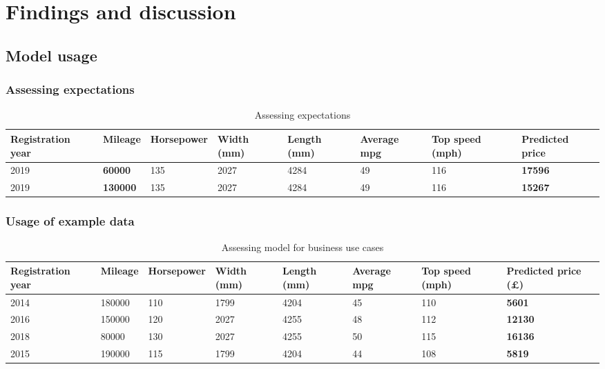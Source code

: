 \chapter{Findings and discussion}

\section{Model usage}
\subsection{Assessing expectations}
\begin{table}[H]
    \begin{adjustbox}{width={\textwidth}}
        \begin{tabular}{|l|l|l|l|l|l|l|l|}
            \hline
            Registration year & \textbf{Mileage} & Horsepower & Width (mm) & Length (mm) & Average mpg & Top speed (mph) & \textbf{Predicted price} \\ \hline
            2019              & \textbf{60000}   & 135        & 2027       & 4284        & 49          & 116             & \textbf{17596}           \\\hline
            2019              & \textbf{130000}  & 135        & 2027       & 4284        & 49          & 116             & \textbf{15267}           \\\hline
        \end{tabular}
    \end{adjustbox}
    \caption{Assessing expectations}
    \label{table_data}
\end{table}
\subsection{Usage of example data}
\begin{table}[H]
    \begin{adjustbox}{width={\textwidth}}
        \begin{tabular}{|l|l|l|l|l|l|l|l|}
            \hline
            Registration year & Mileage & Horsepower & Width (mm) & Length (mm) & Average mpg & Top speed (mph) & \textbf{Predicted price (£)} \\\hline
            2014              & 180000  & 110        & 1799       & 4204        & 45          & 110             & \textbf{5601}                \\\hline
            2016              & 150000  & 120        & 2027       & 4255        & 48          & 112             & \textbf{12130}               \\\hline
            2018              & 80000   & 130        & 2027       & 4255        & 50          & 115             & \textbf{16136}               \\\hline
            2015              & 190000  & 115        & 1799       & 4204        & 44          & 108             & \textbf{5819}                \\ \hline
        \end{tabular}
    \end{adjustbox}
    \caption{Assessing model for business use cases}
    \label{table_data}
\end{table}
